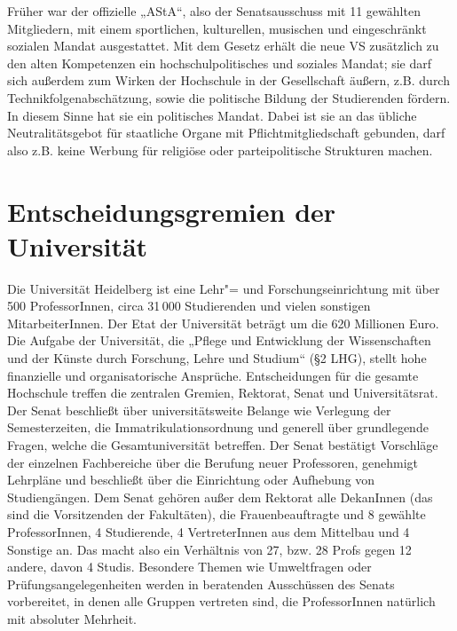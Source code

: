 Früher war der offizielle „AStA“, also der Senatsausschuss mit 11 gewählten
Mitgliedern, mit einem sportlichen, kulturellen, musischen und eingeschränkt
sozialen Mandat ausgestattet.
Mit dem Gesetz erhält die neue VS zusätzlich zu den alten Kompetenzen ein
hochschulpolitisches und soziales Mandat; sie darf sich außerdem zum Wirken der
Hochschule in der Gesellschaft äußern, z.B. durch Technikfolgenabschätzung,
sowie die politische Bildung der Studierenden fördern. In diesem Sinne hat sie
ein politisches Mandat. Dabei ist sie an das übliche Neutralitätsgebot für
staatliche Organe mit Pflichtmitgliedschaft gebunden, darf also z.B. keine
Werbung für religiöse oder parteipolitische Strukturen machen.

\section{Entscheidungsgremien der Universität}

Die Universität Heidelberg ist eine Lehr"= und Forschungseinrichtung mit über
500 ProfessorInnen, circa 31\,000 Studierenden und vielen sonstigen
MitarbeiterInnen. Der Etat der Universität beträgt um die 620 Millionen Euro.
Die Aufgabe der Universität, die „Pflege und Entwicklung der Wissenschaften und
der Künste durch Forschung, Lehre und Studium“ (§2
LHG), stellt hohe finanzielle und organisatorische Ansprüche.  Entscheidungen
für die gesamte Hochschule treffen die zentralen Gremien, Rektorat, Senat und
Universitätsrat. Der Senat beschließt über universitätsweite Belange wie
Verlegung der Semesterzeiten, die Immatrikulationsordnung und generell über
grundlegende Fragen, welche die Gesamtuniversität betreffen. Der Senat
bestätigt Vorschläge der einzelnen Fachbereiche über die Berufung neuer
Professoren, genehmigt Lehrpläne und beschließt über die Einrichtung oder
Aufhebung von Studiengängen. Dem Senat gehören außer dem Rektorat alle
DekanInnen (das sind die Vorsitzenden der Fakultäten), die Frauenbeauftragte
und 8 gewählte ProfessorInnen, 4 Studierende, 4 VertreterInnen aus dem
Mittelbau und 4 Sonstige an. Das macht also ein Verhältnis von 27, bzw. 28
Profs gegen 12 andere, davon 4 Studis. Besondere Themen wie Umweltfragen oder
Prüfungsangelegenheiten werden in beratenden Ausschüssen des Senats
vorbereitet, in denen alle Gruppen vertreten sind, die ProfessorInnen natürlich
mit absoluter Mehrheit.

